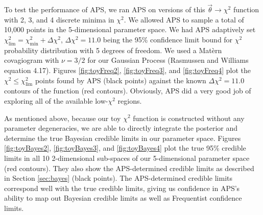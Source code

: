 \documentclass[useAMS,usenatbib]{aastex}
\begin{document}
To test the performance of APS, we ran APS on versions of this
$\vec{\theta}\rightarrow\chi^2$ function with 2, 3, and 4 discrete minima in $\chi^2$.  We
allowed APS to sample a total of 10,000 points in the 5-dimensional parameter space.  
We had APS adaptively set $\chi^2_\text{lim}=\chi^2_\text{min}+\Delta\chi^2$, 
$\Delta\chi^2=11.0$ being the 95\%
confidence limit bound for $\chi^2$ probability distribution with 5 degrees of freedom.
We used a Mat\`ern covagiogram with $\nu=3/2$ for our Gaussian Process (Rasmussen and Williams equation
4.17). Figures \ref{fig:toyFreq2}, \ref{fig:toyFreq3}, and \ref{fig:toyFreq4} plot the
$\chi^2\le\chi^2_\text{lim}$ points found by APS (black points) against the
known $\Delta\chi^2=11.0$ contours of the function (red contours).  Obviously, APS did a very
good job of exploring all of the available low-$\chi^2$ regions.

As mentioned above, because our toy $\chi^2$ function is constructed without any
parameter degeneracies, we are able to directly integrate the posterior and
determine the true Bayesian credible limits in our parameter space.  Figures
\ref{fig:toyBayes2}, \ref{fig:toyBayes3}, and \ref{fig:toyBayes4} plot the true
95\% credible limits in all 10 2-dimensional sub-spaces of our 5-dimensional
parameter space (red contours).  They also show the APS-determined credible
limits as described in Section \ref{sec:bayes} (black points).  The
APS-determined credible limits correspond well with the true credible limits,
giving us confidence in APS's ability to map out Bayesian credible limits as well
as Frequentist confidence limits.
\end{document}
